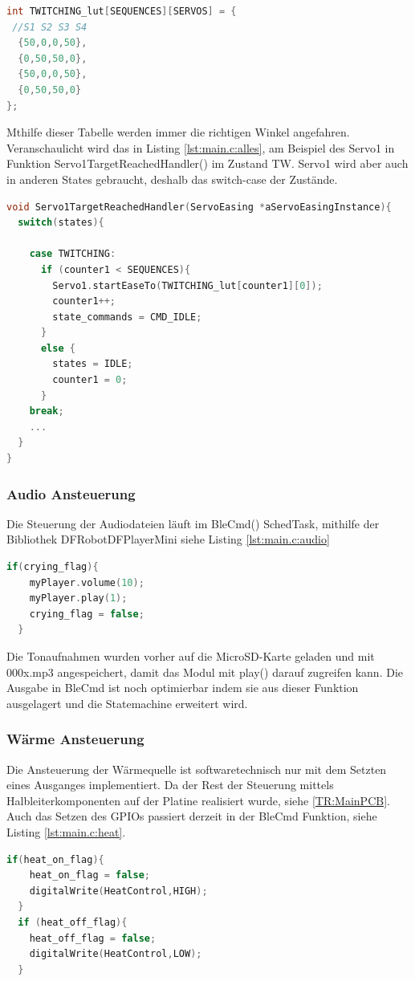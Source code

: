 \begin{lstlisting}[language=C++, caption={Zielwinkel Ansteuerung mit LUT}, label={lst:main.c:LUT}, firstnumber=277]
int TWITCHING_lut[SEQUENCES][SERVOS] = {
 //S1 S2 S3 S4 
  {50,0,0,50},
  {0,50,50,0},
  {50,0,0,50},
  {0,50,50,0}
}; 
\end{lstlisting}
\noindent 
Mthilfe dieser Tabelle werden immer die richtigen Winkel angefahren. Veranschaulicht wird das in Listing \ref{lst:main.c:alles}, am Beispiel des Servo1 in Funktion Servo1TargetReachedHandler() im Zustand TW.
Servo1 wird aber auch in anderen States gebraucht, deshalb das switch-case der Zustände. 
\begin{lstlisting}[language=C++, caption={Anfahren der Winkel}, label={lst:main.c:alles}, firstnumber=298]
void Servo1TargetReachedHandler(ServoEasing *aServoEasingInstance){
  switch(states){
    
    case TWITCHING:
      if (counter1 < SEQUENCES){
        Servo1.startEaseTo(TWITCHING_lut[counter1][0]);
        counter1++; 
        state_commands = CMD_IDLE; 
      }
      else {
        states = IDLE; 
        counter1 = 0; 
      }
    break; 
    ... 
  }
}
\end{lstlisting} 

\subsubsection{Audio Ansteuerung}
Die Steuerung der Audiodateien läuft im BleCmd() SchedTask, mithilfe der Bibliothek DFRobotDFPlayerMini siehe Listing \ref{lst:main.c:audio}
\begin{lstlisting}[language=C++, caption={Audioansteuerung, Beispiel:weinen}, label={lst:main.c:audio},firstnumber=240]
if(crying_flag){ 
    myPlayer.volume(10);
    myPlayer.play(1);
    crying_flag = false; 
  }
\end{lstlisting}
\noindent 
Die Tonaufnahmen wurden vorher auf die MicroSD-Karte geladen und mit 000x.mp3 angespeichert, damit das Modul mit play() darauf zugreifen kann.
Die Ausgabe in BleCmd ist noch optimierbar indem sie aus dieser Funktion ausgelagert und die Statemachine erweitert wird. 

\subsubsection{Wärme Ansteuerung}
Die Ansteuerung der Wärmequelle ist softwaretechnisch nur mit dem Setzten eines Ausganges implementiert. Da der Rest der Steuerung mittels Halbleiterkomponenten
auf der Platine realisiert wurde, siehe \ref{TR:MainPCB}. Auch das Setzen des GPIOs passiert derzeit in der BleCmd Funktion, siehe Listing \ref{lst:main.c:heat}.
\begin{lstlisting}[language=C++, caption={Wärmeansteuerung}, label={lst:main.c:heat},firstnumber=262]
if(heat_on_flag){
    heat_on_flag = false; 
    digitalWrite(HeatControl,HIGH); 
  }
  if (heat_off_flag){
    heat_off_flag = false; 
    digitalWrite(HeatControl,LOW); 
  }
\end{lstlisting}


